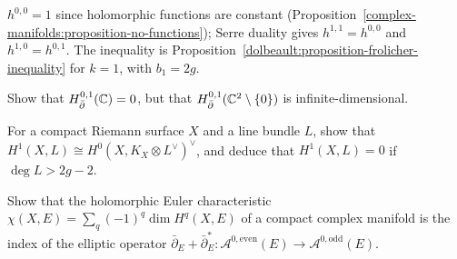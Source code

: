 \begin{solution}
$h^{0,0} = 1$ since holomorphic functions are constant (Proposition~\ref{complex-manifolds:proposition-no-functions}); Serre duality gives $h^{1,1} = h^{0,0}$ and $h^{1,0} = h^{0,1}$. The inequality is
Proposition~\ref{dolbeault:proposition-frolicher-inequality} for $k = 1$, with $b_1 = 2g$.
\end{solution}

\begin{exercise}\label{dolbeault:exercise-dolbeault-plane}
Show that $H^{0,1}_{\bar\partial}(\mathbb{C}) = 0$, but that $H^{0,1}_{\bar\partial}(\mathbb{C}^2 \setminus \{0\})$ is infinite-dimensional.
\end{exercise}

\begin{exercise}\label{dolbeault:exercise-serre-duality-curve}
For a compact Riemann surface $X$ and a line bundle $L$, show that $H^1(X, L) \cong H^0(X, K_X \otimes L^\vee)^\vee$, and deduce that $H^1(X, L) = 0$ if $\deg L > 2g - 2$.
\end{exercise}

\begin{exercise}\label{dolbeault:exercise-euler-characteristic-bundle}
Show that the holomorphic Euler characteristic $\chi(X, E) = \sum_q(-1)^q\dim H^q(X, E)$ of a compact complex manifold is the index of the elliptic operator
$\bar\partial_E + \bar\partial_E^* \colon \mathcal{A}^{0,\mathrm{even}}(E) \to \mathcal{A}^{0,\mathrm{odd}}(E)$.
\end{exercise}
